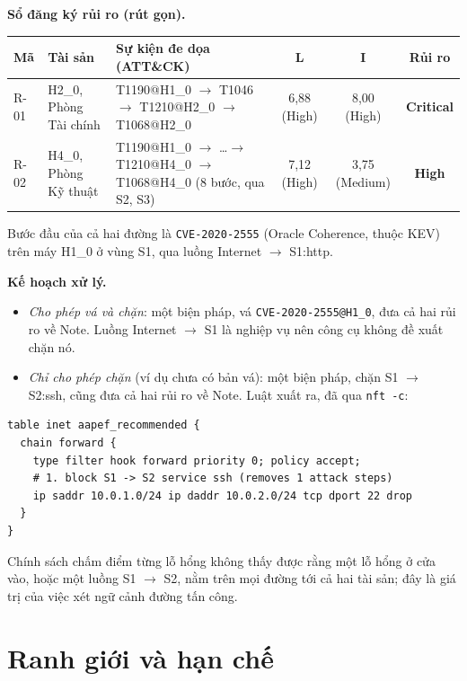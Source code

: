 \documentclass[11pt,a4paper]{article}
\begin{document}
\textbf{Sổ đăng ký rủi ro (rút gọn).}

\begin{center}
\small
\begin{tabular}{@{}lY{2.4cm}Y{5.8cm}ccc@{}}
\toprule
\textbf{Mã} & \textbf{Tài sản} & \textbf{Sự kiện đe dọa (ATT\&CK)} & \textbf{L} & \textbf{I} & \textbf{Rủi ro} \\
\midrule
R-01 & H2\_0, Phòng Tài chính & T1190@H1\_0 $\to$ T1046 $\to$ T1210@H2\_0 $\to$ T1068@H2\_0 & 6,88 (High) & 8,00 (High) & \textbf{Critical} \\
R-02 & H4\_0, Phòng Kỹ thuật & T1190@H1\_0 $\to$ \ldots $\to$ T1210@H4\_0 $\to$ T1068@H4\_0 (8 bước, qua S2, S3) & 7,12 (High) & 3,75 (Medium) & \textbf{High} \\
\bottomrule
\end{tabular}
\end{center}

Bước đầu của cả hai đường là \texttt{CVE-2020-2555} (Oracle Coherence, thuộc KEV) trên máy H1\_0 ở vùng S1, qua luồng Internet $\to$ S1:http.

\textbf{Kế hoạch xử lý.}
\begin{itemize}
  \item \emph{Cho phép vá và chặn}: một biện pháp, vá \texttt{CVE-2020-2555@H1\_0}, đưa cả hai rủi ro về Note. Luồng Internet $\to$ S1 là nghiệp vụ nên công cụ không đề xuất chặn nó.
  \item \emph{Chỉ cho phép chặn} (ví dụ chưa có bản vá): một biện pháp, chặn S1 $\to$ S2:ssh, cũng đưa cả hai rủi ro về Note. Luật xuất ra, đã qua \texttt{nft -c}:
\end{itemize}
\begin{verbatim}
table inet aapef_recommended {
  chain forward {
    type filter hook forward priority 0; policy accept;
    # 1. block S1 -> S2 service ssh (removes 1 attack steps)
    ip saddr 10.0.1.0/24 ip daddr 10.0.2.0/24 tcp dport 22 drop
  }
}
\end{verbatim}

Chính sách chấm điểm từng lỗ hổng không thấy được rằng một lỗ hổng ở cửa vào, hoặc một luồng S1 $\to$ S2, nằm trên mọi đường tới cả hai tài sản; đây là giá trị của việc xét ngữ cảnh đường tấn công.

\section{Ranh giới và hạn chế}
\end{document}
